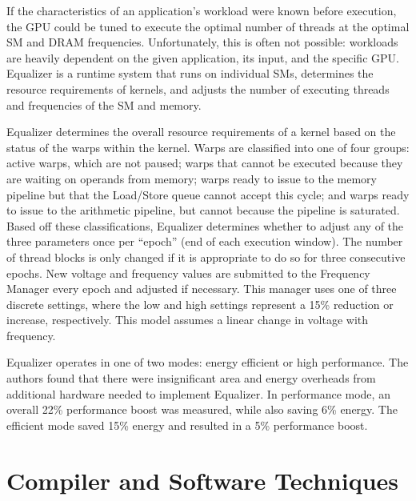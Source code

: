 \documentclass[prodmode,acmtecs]{acmsmall} %
\begin{document}
If the characteristics of an application's workload were known before execution,
the GPU could be tuned to execute the optimal number of threads at the optimal
SM and DRAM frequencies. Unfortunately, this is often not possible: workloads
are heavily dependent on the given application, its input, and the specific GPU.
Equalizer \cite{EqualizerTuningOfResources} is a runtime system that runs on
individual SMs, determines the resource requirements of kernels, and adjusts the
number of executing threads and frequencies of the SM and memory.

Equalizer determines the overall resource requirements of a kernel based on the
status of the warps within the kernel. Warps are classified into one of four
groups: active warps, which are not paused; warps that cannot be executed
because they are waiting on operands from memory; warps ready to issue to the
memory pipeline but that the Load/Store queue cannot accept this cycle; and
warps ready to issue to the arithmetic pipeline, but cannot because the pipeline
is saturated. Based off these classifications, Equalizer determines whether to
adjust any of the three parameters once per ``epoch'' (end of each execution
window). The number of thread blocks is only changed if it is appropriate to do
so for three consecutive epochs. New voltage and frequency values are submitted
to the Frequency Manager every epoch and adjusted if necessary. This manager
uses one of three discrete settings, where the low and high settings represent a
15\% reduction or increase, respectively. This model assumes a linear change in
voltage with frequency.

Equalizer operates in one of two modes: energy efficient or high performance.
The authors found that there were insignificant area and energy overheads from
additional hardware needed to implement Equalizer. In performance mode, an
overall 22\% performance boost was measured, while also saving 6\% energy. The
efficient mode saved 15\% energy and resulted in a 5\% performance boost.

\section{Compiler and Software Techniques} \label{sec:software}
\end{document}
